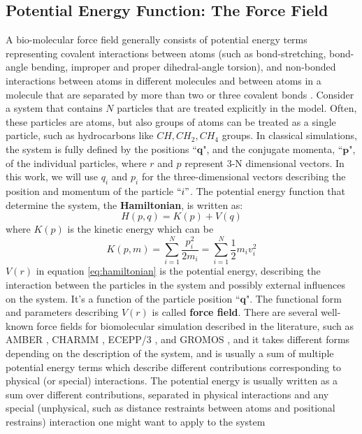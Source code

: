 \subsection{Potential Energy Function: The Force Field}\label{subsec:FF}

A bio-molecular force field generally consists of potential energy terms representing covalent interactions between atoms (such as bond-stretching, bond-angle bending, improper and proper dihedral-angle torsion), and non-bonded interactions between atoms in different molecules and between atoms in a molecule that are separated by more than two or three covalent bonds \cite{van2006biomolecular}. Consider a system that contains $N$ particles that are treated explicitly in the model. Often, these particles are atoms, but also groups of atoms can be treated as a single particle, such as hydrocarbons  like $CH , CH_{2} , CH_{4}$ groups. In classical simulations, the system is fully defined by the positions $\textbf{``q"}$, and the conjugate momenta, $\textbf{``p"}$, of the individual particles, where $r$ and $p$ represent 3-N dimensional vectors. In this work, we will use $q_{i}$ and $p_{i}$ for the three-dimensional vectors describing the position and momentum of the particle $``i"$. The potential energy function that determine the system, the \textbf{Hamiltonian}, is written as:
\begin{equation}
    H(p,q)= K(p)+V(q)
    \label{eq:hamiltonian}
\end{equation}
where $K(p)$ is the kinetic energy which can be
\begin{equation}
    K(p,m)=\sum_{i=1}^{N} \frac{p_{i}^{2}}{2m_{i}} = \sum_{i=1}^{N} \frac{1}{2}m_{i}v_{i}^{2}
\end{equation}
$V(r)$ in equation \ref{eq:hamiltonian} is the potential energy, describing the interaction between the particles in the system and possibly external influences on the system. It's a function of the particle position $\textbf{``q"}$. The functional form and parameters describing $V(r)$ is called \textbf{force field}. There are several well-known force fields for biomolecular simulation described in the literature, such as AMBER \cite{amber}, CHARMM \cite{charmm}, ECEPP/3 \cite{ECEPP/3}, and GROMOS \cite{van2005gromacs}\cite{gromos1}, and it takes different forms depending on the description of the system, and is usually a sum of multiple potential energy terms which describe different contributions corresponding to physical (or special) interactions. The potential energy is usually written as a sum over different contributions, separated in physical interactions and any special (unphysical, such as distance restraints between atoms and positional restrains) interaction one might want to apply to the system
